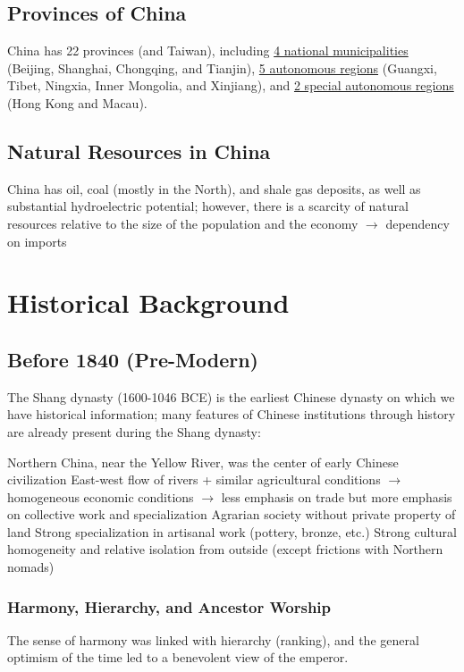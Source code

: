 \documentclass[11pt]{article}
\theoremstyle{definition}
\theoremstyle{remark}
\begin{document}
\subsection{Provinces of China}
China has 22 provinces (and Taiwan), including \underline{4 national municipalities} (Beijing, Shanghai, Chongqing, and Tianjin), \underline{5 autonomous regions} (Guangxi, Tibet, Ningxia, Inner Mongolia, and Xinjiang), and \underline{2 special autonomous regions} (Hong Kong and Macau).

\subsection{Natural Resources in China}
China has oil, coal (mostly in the North), and shale gas deposits, as well as substantial hydroelectric potential; however, there is a scarcity of natural resources relative to the size of the population and the economy $\to$ dependency on imports
\clearpage

\section{Historical Background}
\subsection{Before 1840 (Pre-Modern)}
The Shang dynasty (1600-1046 BCE) is the earliest Chinese dynasty on which we have historical information; many features of Chinese institutions through history are already present during the Shang dynasty:
\begin{outline}[enumerate]
\1 Northern China, near the Yellow River, was the center of early Chinese civilization
\1 East-west flow of rivers + similar agricultural conditions $\to$ homogeneous economic conditions $\to$ less emphasis on trade but more emphasis on collective work and specialization
	\2 Agrarian society without private property of land
	\2 Strong specialization in artisanal work (pottery, bronze, etc.)
	\2 Strong cultural homogeneity and relative isolation from outside (except frictions with Northern nomads)
\end{outline}

\subsubsection{Harmony, Hierarchy, and Ancestor Worship}
The sense of harmony was linked with hierarchy (ranking), and the general optimism of the time led to a benevolent view of the emperor. 
\end{document}
